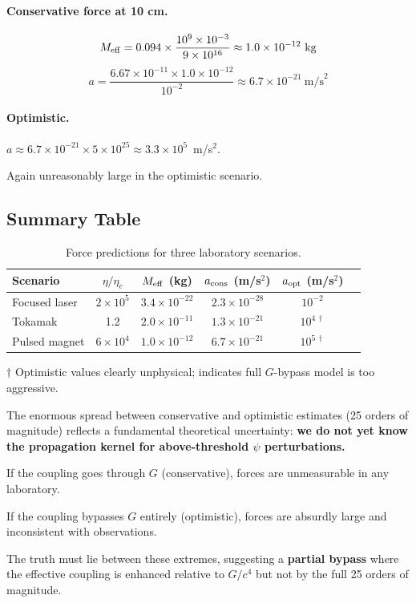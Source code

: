 \documentclass[12pt,a4paper]{article}
\begin{document}
\paragraph{Conservative force at 10 cm.}
\begin{equation}
M_{\rm eff} = 0.094 \times \frac{10^9 \times 10^{-3}}{9 \times 10^{16}}
\approx 1.0 \times 10^{-12}~\text{kg}
\end{equation}
\begin{equation}
a = \frac{6.67 \times 10^{-11} \times 1.0 \times 10^{-12}}{10^{-2}}
\approx 6.7 \times 10^{-21}~\text{m/s}^2
\end{equation}

\paragraph{Optimistic.}
$a \approx 6.7 \times 10^{-21} \times 5 \times 10^{25} \approx 3.3 \times 10^5$~m/s$^2$.

Again unreasonably large in the optimistic scenario.

\subsection{Summary Table}

\begin{table}[h]
\centering
\caption{Force predictions for three laboratory scenarios.}
\label{tab:forces}
\begin{tabular}{lccccc}
\toprule
Scenario & $\eta/\eta_c$ & $M_{\rm eff}$ (kg) & $a_{\rm cons}$ (m/s$^2$) & $a_{\rm opt}$ (m/s$^2$) \\
\midrule
Focused laser & $2 \times 10^5$ & $3.4 \times 10^{-22}$ & $2.3 \times 10^{-28}$ & $10^{-2}$ \\
Tokamak & 1.2 & $2.0 \times 10^{-11}$ & $1.3 \times 10^{-21}$ & $10^{4\,\dagger}$ \\
Pulsed magnet & $6 \times 10^4$ & $1.0 \times 10^{-12}$ & $6.7 \times 10^{-21}$ & $10^{5\,\dagger}$ \\
\bottomrule
\end{tabular}

\smallskip
$\dagger$ Optimistic values clearly unphysical; indicates full $G$-bypass
model is too aggressive.
\end{table}

\begin{tcolorbox}[colback=blue!5!white, colframe=blue!50!black,
  title=Interpretation]
The enormous spread between conservative and optimistic estimates
(25 orders of magnitude) reflects a fundamental theoretical uncertainty:
\textbf{we do not yet know the propagation kernel for above-threshold
$\psi$ perturbations.}

If the coupling goes through $G$ (conservative), forces are unmeasurable
in any laboratory.

If the coupling bypasses $G$ entirely (optimistic), forces are absurdly
large and inconsistent with observations.

The truth must lie between these extremes, suggesting a \textbf{partial
bypass} where the effective coupling is enhanced relative to $G/c^4$
but not by the full 25 orders of magnitude.
\end{tcolorbox}
\end{document}

